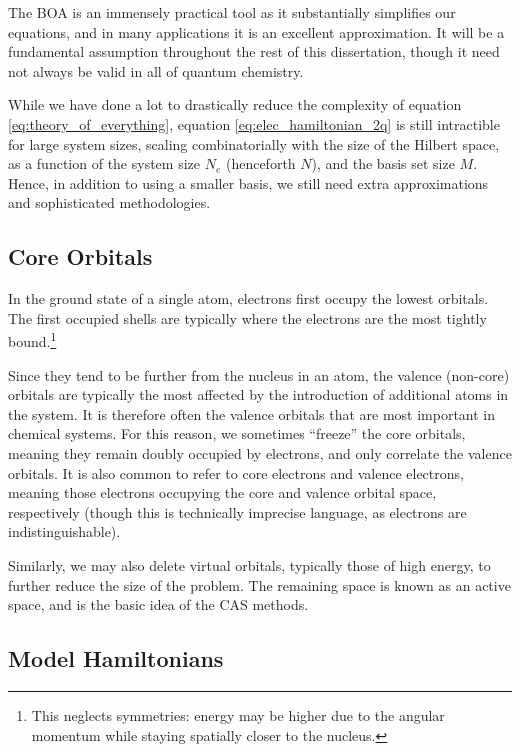 The \gls{BOA} is an immensely practical tool as it substantially simplifies our equations, and in many applications it is an excellent approximation. It will be a fundamental assumption throughout the rest of this dissertation, though it need not always be valid in all of quantum chemistry.

While we have done a lot to drastically reduce the complexity of equation \ref{eq:theory_of_everything}, equation \ref{eq:elec_hamiltonian_2q} is still intractible for large system sizes, scaling combinatorially with the size of the Hilbert space, as a function of the system size $N_e$ (henceforth $N$), and the basis set size $M$. Hence, in addition to using a smaller basis, we still need extra approximations and sophisticated methodologies.


\subsection{Core Orbitals}
\label{sec:core_electrons}

In the ground state of a single atom, electrons first occupy the lowest orbitals. The first occupied shells are typically where the electrons are the most tightly bound.\footnote{This neglects symmetries: energy may be higher due to the angular momentum while staying spatially closer to the nucleus.}

Since they tend to be further from the nucleus in an atom, the valence (non-core) orbitals are typically the most affected by the introduction of additional atoms in the system. It is therefore often the valence orbitals that are most important in chemical systems. For this reason, we sometimes ``freeze'' the core orbitals, meaning they remain doubly occupied by electrons, and only correlate the valence orbitals. It is also common to refer to core electrons and valence electrons, meaning those electrons occupying the core and valence orbital space, respectively (though this is technically imprecise language, as electrons are indistinguishable).

Similarly, we may also delete virtual orbitals, typically those of high energy, to further reduce the size of the problem. The remaining space is known as an active space, and is the basic idea of the \gls{CAS} methods.

\subsection{Model Hamiltonians}

